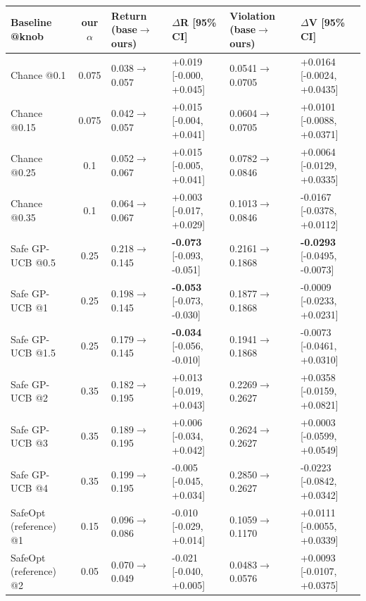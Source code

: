\begin{tabular}{lcllll}
\toprule
Baseline @knob & our $\alpha$ & Return (base$\to$ours) & $\Delta$R [95\% CI] & Violation (base$\to$ours) & $\Delta$V [95\% CI] \\
\midrule
Chance @0.1 & 0.075 & 0.038$\to$0.057 & +0.019 [-0.000, +0.045] & 0.0541$\to$0.0705 & +0.0164 [-0.0024, +0.0435] \\
Chance @0.15 & 0.075 & 0.042$\to$0.057 & +0.015 [-0.004, +0.041] & 0.0604$\to$0.0705 & +0.0101 [-0.0088, +0.0371] \\
Chance @0.25 & 0.1 & 0.052$\to$0.067 & +0.015 [-0.005, +0.041] & 0.0782$\to$0.0846 & +0.0064 [-0.0129, +0.0335] \\
Chance @0.35 & 0.1 & 0.064$\to$0.067 & +0.003 [-0.017, +0.029] & 0.1013$\to$0.0846 & -0.0167 [-0.0378, +0.0112] \\
Safe GP-UCB @0.5 & 0.25 & 0.218$\to$0.145 & \textbf{-0.073} [-0.093, -0.051] & 0.2161$\to$0.1868 & \textbf{-0.0293} [-0.0495, -0.0073] \\
Safe GP-UCB @1 & 0.25 & 0.198$\to$0.145 & \textbf{-0.053} [-0.073, -0.030] & 0.1877$\to$0.1868 & -0.0009 [-0.0233, +0.0231] \\
Safe GP-UCB @1.5 & 0.25 & 0.179$\to$0.145 & \textbf{-0.034} [-0.056, -0.010] & 0.1941$\to$0.1868 & -0.0073 [-0.0461, +0.0310] \\
Safe GP-UCB @2 & 0.35 & 0.182$\to$0.195 & +0.013 [-0.019, +0.043] & 0.2269$\to$0.2627 & +0.0358 [-0.0159, +0.0821] \\
Safe GP-UCB @3 & 0.35 & 0.189$\to$0.195 & +0.006 [-0.034, +0.042] & 0.2624$\to$0.2627 & +0.0003 [-0.0599, +0.0549] \\
Safe GP-UCB @4 & 0.35 & 0.199$\to$0.195 & -0.005 [-0.045, +0.034] & 0.2850$\to$0.2627 & -0.0223 [-0.0842, +0.0342] \\
SafeOpt (reference) @1 & 0.15 & 0.096$\to$0.086 & -0.010 [-0.029, +0.014] & 0.1059$\to$0.1170 & +0.0111 [-0.0055, +0.0339] \\
SafeOpt (reference) @2 & 0.05 & 0.070$\to$0.049 & -0.021 [-0.040, +0.005] & 0.0483$\to$0.0576 & +0.0093 [-0.0107, +0.0375] \\
\bottomrule
\end{tabular}
